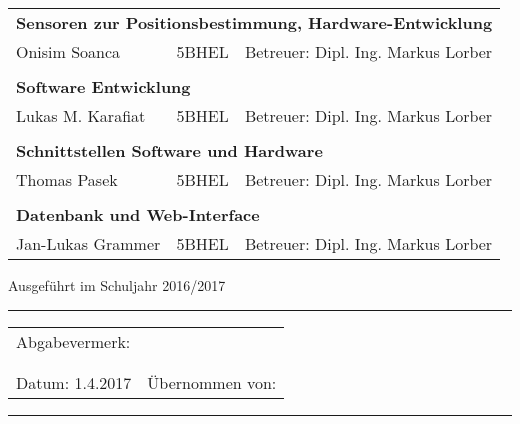 \begin{titlepage}
\begin{tabular}{llr}
\multicolumn{3}{l}{\large{ \textbf{Sensoren zur Positionsbestimmung, Hardware-Entwicklung}}} \\
\large{Onisim Soanca} & \hspace{0.5cm}\large{5BHEL}\hspace{0.5cm} &  \large{Betreuer: Dipl. Ing. Markus Lorber}\\
 \\
\multicolumn{3}{l}{\large{ \textbf{Software Entwicklung}}} \\
\large{Lukas M. Karafiat} & \hspace{0.5cm}\large{5BHEL}\hspace{0.5cm} &  \large{Betreuer: Dipl. Ing. Markus Lorber}\\
 \\
\multicolumn{3}{l}{\large{ \textbf{Schnittstellen Software und Hardware}}} \\
\large{Thomas Pasek} & \hspace{0.5cm}\large{5BHEL}\hspace{0.5cm} &  \large{Betreuer: Dipl. Ing. Markus Lorber}\\
 \\
\multicolumn{3}{l}{\large{ \textbf{Datenbank und Web-Interface}}} \\
\large{Jan-Lukas Grammer} & \hspace{0.5cm}\large{5BHEL}\hspace{0.5cm} &  \large{Betreuer: Dipl. Ing. Markus Lorber}\\

\end{tabular}



\vspace{1.5cm}
\normalsize
Ausgeführt im Schuljahr 2016/2017\\
\vspace{0.7cm}
\noindent\rule{\textwidth}{1pt}
\begin{tabular}{lr}
Abgabevermerk:\\
\\
\\
Datum: 1.4.2017 &\hspace{4cm}   Übernommen von:\\
\end{tabular}

\noindent\rule{\textwidth}{1pt}




\end{titlepage}
